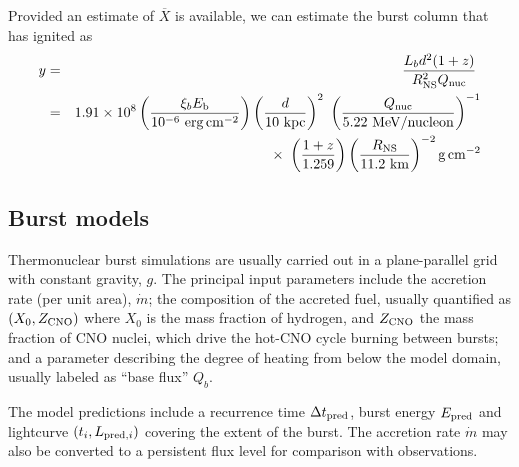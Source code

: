 \documentclass{aastex63}
\newcommand{\epc}{{\rm erg\,cm^{-2}}}
\newcommand{\Xb}{\ensuremath{\overline{X}}}
\newcommand{\opz}{1.259}
\begin{document}
Provided an estimate of $\Xb$ is available, we can estimate the burst column that has ignited as
\begin{eqnarray}
y & = & \frac{L_b d^2 (1+z)}{R_{\rm NS}^2 Q_{\rm nuc}}\ 
                                                            \nonumber \\
  & = & 1.91\times10^8 \left(\frac{\xi_b E_{\rm b}}{10^{-6}\ \epc}\right)
                      \left(\frac{d}{10\ {\rm kpc}}\right)^2\
             \left(\frac{Q_{\rm nuc}}{5.22\ {\rm MeV/nucleon}}\right)^{-1}
\nonumber \\ & & \times\  %
                      \left(\frac{1+z}{\opz}\right)
                      \left(\frac{R_{\rm NS}}{11.2\ {\rm km}}\right)^{-2}
                      {\rm g\,cm^{-2}}
\label{eq:column}
\end{eqnarray}

\subsection{Burst models}
\label{subsec:models}

Thermonuclear burst simulations \cite[e.g. with {\sc kepler};][]{woos04} are usually carried out in a plane-parallel grid with constant gravity, $g$. The principal input parameters include the accretion rate (per unit area), $\dot{m}$; the composition of the accreted fuel, usually quantified as $(X_0, Z_{\rm CNO})$ where $X_0$ is the mass fraction of hydrogen, and $Z_{\rm CNO}$ the mass fraction of CNO nuclei, which drive the hot-CNO cycle burning between bursts; and a parameter describing the degree of heating from below the model domain, usually labeled as ``base flux'' $Q_b$.

The model predictions include a recurrence time $\Delta t_{\rm pred}$, burst energy $E_{\rm pred}$ and lightcurve $(t_i,L_{{\rm pred},i})$ covering the extent of the burst.
%
The accretion rate $\dot{m}$ may also be converted to a persistent flux level for comparison with observations.
\end{document}
